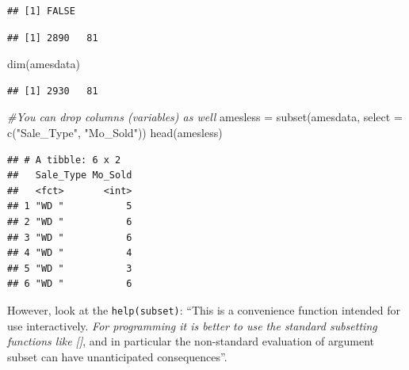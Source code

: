 \documentclass[
]{book}
\newenvironment{Shaded}{\begin{snugshade}}{\end{snugshade}}
\newcommand{\AttributeTok}[1]{\textcolor[rgb]{0.77,0.63,0.00}{#1}}
\newcommand{\CommentTok}[1]{\textcolor[rgb]{0.56,0.35,0.01}{\textit{#1}}}
\newcommand{\FunctionTok}[1]{\textcolor[rgb]{0.00,0.00,0.00}{#1}}
\newcommand{\NormalTok}[1]{#1}
\newcommand{\OtherTok}[1]{\textcolor[rgb]{0.56,0.35,0.01}{#1}}
\newcommand{\SpecialCharTok}[1]{\textcolor[rgb]{0.00,0.00,0.00}{#1}}
\newcommand{\StringTok}[1]{\textcolor[rgb]{0.31,0.60,0.02}{#1}}
\theoremstyle{definition}
\theoremstyle{definition}
\theoremstyle{definition}
\theoremstyle{definition}
\theoremstyle{remark}
\begin{document}
\begin{verbatim}
## [1] FALSE
\end{verbatim}

\begin{Shaded}
\end{Shaded}

\begin{verbatim}
## [1] 2890   81
\end{verbatim}

\begin{Shaded}
\begin{Highlighting}[]
\FunctionTok{dim}\NormalTok{(amesdata)}
\end{Highlighting}
\end{Shaded}

\begin{verbatim}
## [1] 2930   81
\end{verbatim}

\begin{Shaded}
\begin{Highlighting}[]
\CommentTok{\#You can drop columns (variables) as well}
\NormalTok{amesless }\OtherTok{=} \FunctionTok{subset}\NormalTok{(amesdata, }\AttributeTok{select =} \FunctionTok{c}\NormalTok{(}\StringTok{"Sale\_Type"}\NormalTok{, }\StringTok{"Mo\_Sold"}\NormalTok{))}
\FunctionTok{head}\NormalTok{(amesless)}
\end{Highlighting}
\end{Shaded}

\begin{verbatim}
## # A tibble: 6 x 2
##   Sale_Type Mo_Sold
##   <fct>       <int>
## 1 "WD "           5
## 2 "WD "           6
## 3 "WD "           6
## 4 "WD "           4
## 5 "WD "           3
## 6 "WD "           6
\end{verbatim}

However, look at the \texttt{help(subset)}: ``This is a convenience function intended for use interactively. \emph{For programming it is better to use the standard subsetting functions like {[}{]}}, and in particular the non-standard evaluation of argument subset can have unanticipated consequences''.
\end{document}
